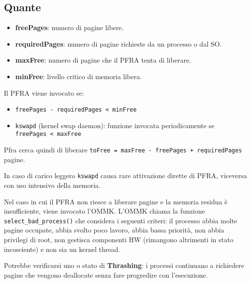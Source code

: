 \documentclass[12pt, a4paper]{report}
\begin{document}
\subsection{Quante}
\begin{itemize}
	\item \textbf{freePages}: numero di pagine libere.
	\item \textbf{requiredPages}: numero di pagine richieste da un processo o
		dal SO.
	\item \textbf{maxFree}: numero di pagine che il PFRA tenta di liberare.
	\item \textbf{minFree}: livello critico di memoria libera.
\end{itemize}
Il PFRA viene invocato se:
\begin{itemize}
	\item \texttt{freePages - requiredPages < minFree}
	\item \texttt{kswapd} (kernel swap daemon): funzione invocata periodicamente
		se \texttt{freePages < maxFree}
\end{itemize}
Pfra cerca quindi di liberare \texttt{toFree = maxFree - freePages +
requiredPages} pagine.

In caso di carico leggero \texttt{kswapd} causa rare attivazione dirette di
PFRA, viceversa con uso intensivo della memoria.

Nel caso in cui il PFRA non riesce a liberare pagine e la memoria residua è
insufficiente, viene invocato l'OMMK. L'OMMK chiama la funzione
\texttt{select\_bad\_process()} che considera i seguenti criteri: il processo
abbia molte pagine occupate, abbia svolto poco lavoro, abbia bassa priorità,
non abbia privilegi di root, non gestisca componenti HW (rimangono altrimenti in
stato incosciente) e non sia un kernel thread.

Potrebbe verificarsi uno o stato di \textbf{Thrashing}: i processi
continuano a richiedere pagine che vengono deallocate senza fare progredire con
l'esecuzione.
\end{document}
